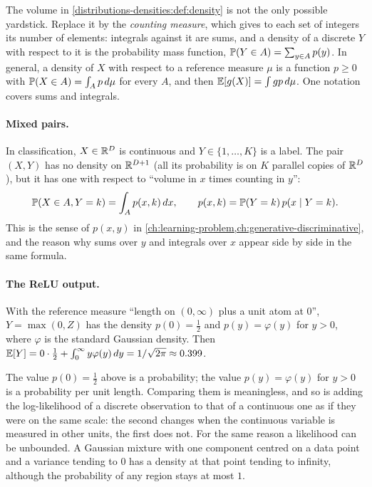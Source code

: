 \begin{notechapter}
The volume in \cref{distributions-densities:def:density} is not the only possible yardstick. Replace it
by the \emph{counting measure}, which gives to each set of integers its number of elements: integrals
against it are sums, and a density of a discrete $Y$ with respect to it is the probability mass function,
$\mathbb{P}(Y\in A) = \sum_{y\in A}p(y)$. In general, a density of $X$ with respect to a reference measure $\mu$ is a
function $p\geq0$ with $\mathbb{P}(X\in A) = \int_Ap\,d\mu$ for every $A$, and then $\mathbb{E}[g(X)] = \int gp\,d\mu$. One
notation covers sums and integrals.

\paragraph{Mixed pairs.} In classification, $X\in\mathbb{R}^D$ is continuous and $Y\in\{1, \dots, K\}$ is a label.
The pair $(X, Y)$ has no density on $\mathbb{R}^{D+1}$ (all its probability is on $K$ parallel copies of $\mathbb{R}^D$), but
it has one with respect to ``volume in $x$ times counting in $y$'':
\[
  \mathbb{P}(X\in A, Y = k) = \int_Ap(x, k)\,dx,\qquad p(x, k) = \mathbb{P}(Y = k)\,p(x\mid Y = k).
\]
This is the sense of $p(x, y)$ in \cref{ch:learning-problem,ch:generative-discriminative}, and the
reason why sums over $y$ and integrals over $x$ appear side by side in the same formula.

\paragraph{The ReLU output.} With the reference measure ``length on $(0, \infty)$ plus a unit atom at $0$'',
$Y = \max(0, Z)$ has the density $p(0) = \frac12$ and $p(y) = \varphi(y)$ for $y > 0$, where $\varphi$ is the
standard Gaussian density. Then $\mathbb{E}[Y] = 0\cdot\frac12 + \int_0^\infty y\varphi(y)\,dy = 1/\sqrt{2\pi}\approx0.399$.

\begin{pitfall}
The value $p(0) = \frac12$ above is a probability; the value $p(y) = \varphi(y)$ for $y > 0$ is a probability
per unit length. Comparing them is meaningless, and so is adding the log-likelihood of a discrete
observation to that of a continuous one as if they were on the same scale: the second changes when the
continuous variable is measured in other units, the first does not. For the same reason a likelihood
can be unbounded. A Gaussian mixture with one component centred on a data point and a variance
tending to $0$ has a density at that point tending to infinity, although the probability of any region
stays at most $1$.
\end{pitfall}


\end{notechapter}
